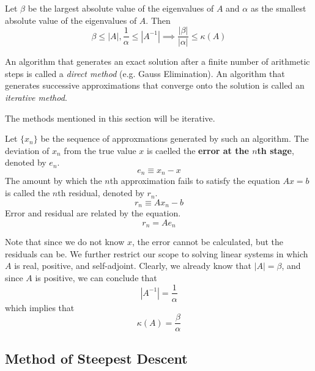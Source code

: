   Let $\beta$ be the largest absolute value of the eigenvalues of $A$ and $\alpha$ as the smallest absolute value of the eigenvalues of $A$. Then 
  \[\beta \leq |A|, \frac{1}{\alpha} \leq |A^{-1}| \implies \frac{|\beta|}{|\alpha|} \leq \kappa(A)\]


  \begin{definition}
  An algorithm that generates an exact solution after a finite number of arithmetic steps is called a \textit{direct method} (e.g. Gauss Elimination). An algorithm that generates successive approximations that converge onto the solution is called an \textit{iterative method}. 
  \end{definition}

  The methods mentioned in this section will be iterative. 
  \begin{definition}
  Let $\{ x_n\}$ be the sequence of approxmations generated by such an algorithm. The deviation of $x_n$ from the true value $x$ is caelled the \textbf{error at the $n$th stage}, denoted by $e_n$. 
  \[e_n \equiv x_n - x\]
  The amount by which the $n$th approximation fails to satisfy the equation $Ax = b$ is called the $n$th residual, denoted by $r_n$. 
  \[r_n \equiv A x_n - b\]
  Error and residual are related by the equation. 
  \[r_n = A e_n\]
  \end{definition}
  Note that since we do not know $x$, the error cannot be calculated, but the residuals can be. We further restrict our scope to solving linear systems in which $A$ is real, positive, and self-adjoint. Clearly, we already know that $|A| = \beta$, and since $A$ is positive, we can conclude that 
  \[|A^{-1}| = \frac{1}{\alpha}\]
  which implies that
  \[\kappa(A) = \frac{\beta}{\alpha}\]

\subsection{Method of Steepest Descent}

